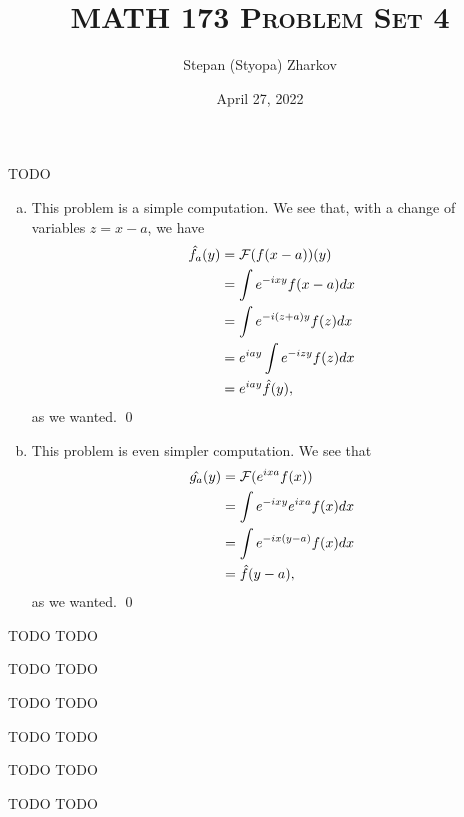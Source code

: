 \documentclass{article}
\title{\textsc{MATH 173 Problem Set 4}}
\author{Stepan (Styopa) Zharkov}
\date{April 27, 2022}
\begin{document}
\maketitle
{} TODO  \tri
\hop 
\solution
\begin{enumerate}[(a)]
    \item This problem is a simple computation. We see that, with a change of variables $z = x-a$, we have
    \begin{align*}
        \hat{f_a}(y) &= \cal{F}(f(x-a))(y) \\
        &= \int e^{-ixy}f(x-a)dx \\
        &= \int e^{-i(z+a)y}f(z)dx \\
        &= e^{iay}\int e^{-izy}f(z)dx \\
        &= e^{iay}\hat{f}(y),
    \end{align*}
    as we wanted. \qed
    \item This problem is even simpler computation. We see that 
    \begin{align*}
        \hat{g_a}(y) &= \cal{F}(e^{ixa}f(x))\\
        &= \int e^{-ixy}e^{ixa}f(x)dx \\
        &= \int e^{-ix(y-a)}f(x)dx \\
        &= \hat{f}(y-a),
    \end{align*}
    as we wanted. \qed
\end{enumerate}


\newpage
{} TODO  \tri
\hop 
\solution
TODO


\newpage
{} TODO  \tri
\hop 
\solution
TODO


\newpage
{} TODO  \tri
\hop 
\solution
TODO


\newpage
{} TODO  \tri
\hop 
\solution
TODO


\newpage
{} TODO  \tri
\hop 
\solution
TODO


\newpage
{} TODO  \tri
\hop 
\solution
TODO
\end{document}
